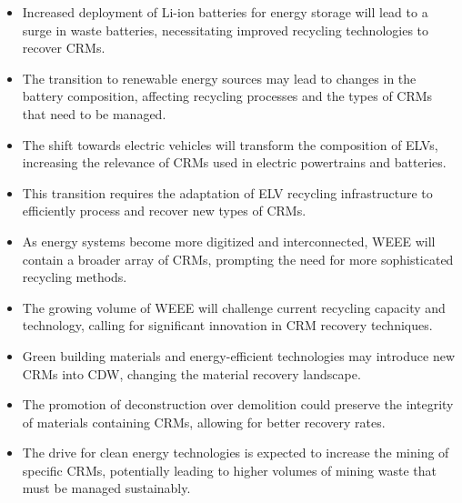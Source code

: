 \wasteSubsubsubsecBATT
\vspace{-1cm}
\begin{itemize}
    \item Increased deployment of Li-ion batteries for energy storage will lead to a surge in waste batteries, necessitating improved recycling technologies to recover CRMs.
    \item The transition to renewable energy sources may lead to changes in the battery composition, affecting recycling processes and the types of CRMs that need to be managed.
\end{itemize}

\wasteSubsubsubsecELV
\vspace{-1cm}
\begin{itemize}
    \item The shift towards electric vehicles will transform the composition of ELVs, increasing the relevance of CRMs used in electric powertrains and batteries.
    \item This transition requires the adaptation of ELV recycling infrastructure to efficiently process and recover new types of CRMs.
\end{itemize}

\wasteSubsubsubsecWEEE
\vspace{-1cm}
\begin{itemize}
    \item As energy systems become more digitized and interconnected, WEEE will contain a broader array of CRMs, prompting the need for more sophisticated recycling methods.
    \item The growing volume of WEEE will challenge current recycling capacity and technology, calling for significant innovation in CRM recovery techniques.
\end{itemize}

\wasteSubsubsubsecCDW
\vspace{-1cm}
\begin{itemize}
    \item Green building materials and energy-efficient technologies may introduce new CRMs into CDW, changing the material recovery landscape.
    \item The promotion of deconstruction over demolition could preserve the integrity of materials containing CRMs, allowing for better recovery rates.
\end{itemize}

\wasteSubsubsubsecMIN
\vspace{-1cm}
\begin{itemize}
    \item The drive for clean energy technologies is expected to increase the mining of specific CRMs, potentially leading to higher volumes of mining waste that must be managed sustainably.
\end{itemize}

